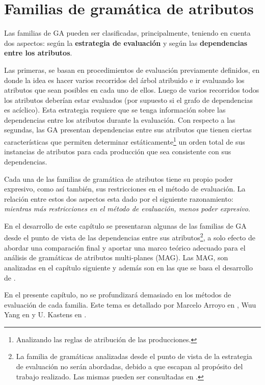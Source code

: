 \chapter{Familias de gramática de atributos}
\label{chap:clas_ag}
\minitoc

Las familias de GA pueden ser clasificadas, principalmente, teniendo en cuenta dos aspectos: según la \textbf{estrategia de evaluación} y según las \textbf{dependencias entre los atributos}. 

Las primeras, se basan en procedimientos de evaluación previamente definidos, en donde la idea es hacer varios recorridos del árbol atribuido e ir evaluando los atributos que sean posibles en cada uno de ellos. Luego de varios recorridos todos los atributos deberían estar evaluados (por supuesto si el grafo de dependencias es acíclico). Esta estrategia requiere que se tenga información sobre las dependencias entre los atributos durante la evaluación. Con respecto a las segundas, las GA presentan dependencias entre sus atributos que tienen ciertas características que permiten determinar estáticamente\footnote{Analizando las reglas de atribución de las producciones.} un orden total de sus instancias de atributos para cada producción que sea consistente con sus dependencias. 

Cada una de las familias de gramática de atributos tiene su propio poder expresivo, como así también, sus restricciones en el método de evaluación. La relación entre estos dos aspectos esta dado por el siguiente razonamiento: \textit{mientras más restricciones en el método de evaluación, menos poder expresivo}.

En el desarrollo de este capítulo se presentaran algunas de las familias de GA desde el punto de vista de las dependencias entre sus atributos\footnote{La familia de gramáticas analizadas desde el punto de vista de la estrategia de evaluación no serán abordadas, debido a que escapan al propósito del trabajo realizado. Las mismas pueden ser consultadas en \cite{tesismarcelo}.}, a solo efecto de abordar una comparación final y aportar una marco teórico adecuado para el análisis de gramáticas de atributos multi-planes (MAG). Las MAG, son analizadas en el capítulo siguiente y además son en las que se basa el desarrollo de \maggen. 

En el presente capítulo, no se profundizará demasiado en los métodos de evaluación de cada familia. Este tema es detallado por Marcelo Arroyo en \cite{tesismarcelo}, Wuu Yang en \cite{wuu-yang2} y U. Kastens en \cite{kastens}.

